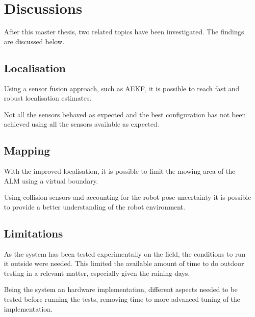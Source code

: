 \chapter{Discussions}
\label{ch:discussion}



\noindent After this master thesis, two related topics have been investigated.
The findings are discussed below.


\section{Localisation}
\noindent
Using a sensor fusion approach, such as \gls{AEKF}, it is possible to reach fast and robust localisation estimates.

Not all the sensors behaved as expected and the best configuration has not been achieved using all the sensors available as expected.

\section{Mapping}
\noindent
With the improved localisation, it is possible to limit the mowing area of the \gls{ALM} using a virtual boundary.

Using collision sensors and accounting for the robot pose uncertainty it is possible to provide a better understanding of the robot environment.


\section{Limitations}
\label{sec:limitations}
\noindent As the system has been tested experimentally on the field, the conditions to run it outside were needed.
This limited the available amount of time to do outdoor testing in a relevant matter, especially given the raining days.

Being the system an hardware implementation, different aspects needed to be tested before running the tests, removing time to more advanced tuning of the implementation.


\cleardoublepage

